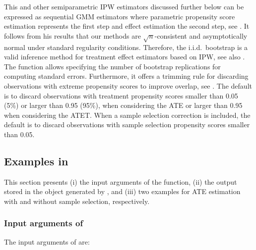 \documentclass[nojss]{jss}
\begin{document}
This and other semiparametric IPW estimators discussed further below can be expressed as sequential GMM estimators where parametric propensity score estimation represents the first step and effect estimation the second step, see \citet{Ne84}. It follows from his results that our methods are $\sqrt{n}$-consistent and asymptotically normal under standard regularity conditions. Therefore, the i.i.d.\ bootstrap is a valid inference method for treatment effect estimators based on IPW, see also \citet{Hirano+00}. The function  allows specifying the number of bootstrap replications for computing standard errors. Furthermore, it offers a trimming rule for discarding observations with extreme propensity scores to improve overlap, see \citet{CrHoImMi09}.  The default is to discard observations with treatment propensity scores smaller than 0.05 (5\%) or larger than 0.95 (95\%), when considering the ATE or larger than 0.95 when considering the ATET. When a sample selection correction is included, the default is to discard observations with sample selection propensity scores smaller than 0.05.

\subsection[{Examples in R}]{Examples in }

This section presents (i) the input arguments of the  function, (ii) the output stored in the object generated by , and (iii) two examples for ATE estimation with and without sample selection, respectively.

\subsubsection[{Input arguments of treatweight}]{Input arguments of }

The input arguments of  are:
\end{document}
